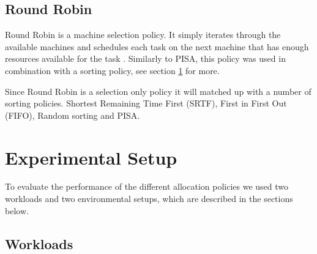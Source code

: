 \documentclass[twocolumn,a4]{scrartcl}
\begin{document}
\subsection{Round Robin} \label{sec_round_robin}

Round Robin is a machine selection policy. It simply iterates through the available machines and schedules each task on the next machine that has enough resources available for the task \cite{DBLP:journals/jacm/Rasch70}. Similarly to PISA, this policy was used in combination with a sorting policy, see section \ref{sec_experimental_setup}  for more.

Since Round Robin is a selection only policy it will matched up with a number of sorting policies. Shortest Remaining Time First (SRTF), First in First Out (FIFO), Random sorting and PISA.



\section{Experimental Setup} \label{sec_experimental_setup}

To evaluate the performance of the different allocation policies we used two workloads and two environmental setups, which are described in the sections below.

\subsection{Workloads} \label{sec_workloads}
\end{document}
